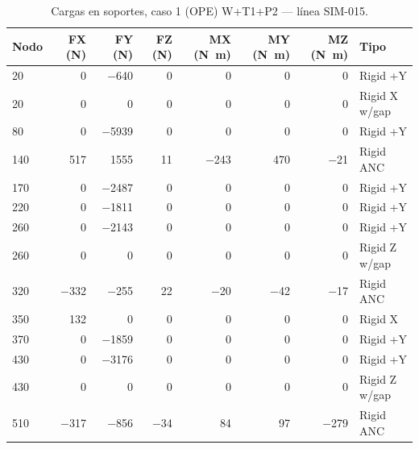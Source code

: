 \begin{table}[htbp]
  \centering
  \footnotesize
  \caption{Cargas en soportes, caso 1 (OPE) W+T1+P2 — línea SIM-015.}
  \label{tab:restricciones-ope}
  \begin{tabular}{lrrrrrrl}
    \toprule
    Nodo & FX (\si{N}) & FY (\si{N}) & FZ (\si{N}) & MX (\si{N.m}) & MY (\si{N.m}) & MZ (\si{N.m}) & Tipo \\
    \midrule
    20 & \num{0} & \num{-640} & \num{0} & \num{0} & \num{0} & \num{0} & Rigid +Y \\
    20 & \num{0} & \num{0} & \num{0} & \num{0} & \num{0} & \num{0} & Rigid X w/gap \\
    80 & \num{0} & \num{-5939} & \num{0} & \num{0} & \num{0} & \num{0} & Rigid +Y \\
    140 & \num{517} & \num{1555} & \num{11} & \num{-243} & \num{470} & \num{-21} & Rigid ANC \\
    170 & \num{0} & \num{-2487} & \num{0} & \num{0} & \num{0} & \num{0} & Rigid +Y \\
    220 & \num{0} & \num{-1811} & \num{0} & \num{0} & \num{0} & \num{0} & Rigid +Y \\
    260 & \num{0} & \num{-2143} & \num{0} & \num{0} & \num{0} & \num{0} & Rigid +Y \\
    260 & \num{0} & \num{0} & \num{0} & \num{0} & \num{0} & \num{0} & Rigid Z w/gap \\
    320 & \num{-332} & \num{-255} & \num{22} & \num{-20} & \num{-42} & \num{-17} & Rigid ANC \\
    350 & \num{132} & \num{0} & \num{0} & \num{0} & \num{0} & \num{0} & Rigid X \\
    370 & \num{0} & \num{-1859} & \num{0} & \num{0} & \num{0} & \num{0} & Rigid +Y \\
    430 & \num{0} & \num{-3176} & \num{0} & \num{0} & \num{0} & \num{0} & Rigid +Y \\
    430 & \num{0} & \num{0} & \num{0} & \num{0} & \num{0} & \num{0} & Rigid Z w/gap \\
    510 & \num{-317} & \num{-856} & \num{-34} & \num{84} & \num{97} & \num{-279} & Rigid ANC \\
    \bottomrule
  \end{tabular}
\end{table}
